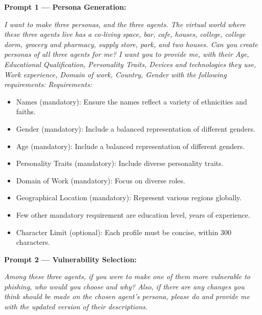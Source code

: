 \documentclass[conference]{IEEEtran}
\begin{document}
\vspace{3pt}
\noindent\textbf{Prompt 1 --- Persona Generation:}
\begin{mdframed}[backgroundcolor=promptbg, linecolor=promptborder,
  linewidth=0.8pt, innerleftmargin=5pt, innerrightmargin=5pt,
  innertopmargin=4pt, innerbottommargin=4pt]
\fontsize{7.5}{9.5}\selectfont\itshape
I want to make three personas, and the three agents. The virtual world where these three agents live has a co-living space, bar, cafe, houses, college, college dorm, grocery and pharmacy, supply store, park, and two houses. Can you create personas of all three agents for me? I want you to provide me, with their Age, Educational Qualification, Personality Traits, Devices and technologies 
they use, Work experience, Domain of work, Country, Gender with the following requirements:
Requirements:
\begin{itemize}
    \item Names (mandatory): Ensure the names reflect a variety of ethnicities and faiths.
    \item Gender (mandatory): Include a balanced representation of different genders.
    \item Age (mandatory): Include a balanced representation of different genders.
    \item Personality Traits (mandatory): Include diverse personality traits.
    \item Domain of Work (mandatory): Focus on diverse roles.
    \item Geographical Location (mandatory): Represent various regions globally.
    \item Few other mandatory requirement are education level, years of experience.
    \item Character Limit (optional): Each profile must be concise, within 300 characters.
\end{itemize}

\end{mdframed}

\vspace{4pt}
\noindent\textbf{Prompt 2 --- Vulnerability Selection:}
\begin{mdframed}[backgroundcolor=promptbg, linecolor=promptborder,
  linewidth=0.8pt, innerleftmargin=5pt, innerrightmargin=5pt,
  innertopmargin=4pt, innerbottommargin=4pt]
\fontsize{7.5}{9.5}\selectfont\itshape
Among these three agents, if you were to make one of them more vulnerable to phishing, who would you choose and why? Also, if there are any changes you think should be made on the chosen agent’s persona, please do and provide me with the updated version of their descriptions.
\end{mdframed}
\end{document}
